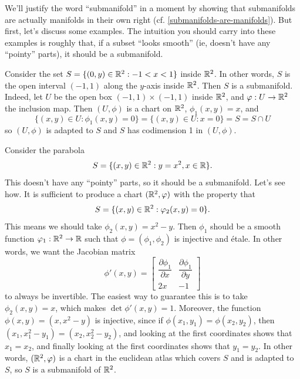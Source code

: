 We'll justify the word ``submanifold'' in a moment by showing that submanifolds are actually manifolds in their own right (cf. \cref{submanifolds-are-manifolds}). But first, let's discuss some examples. The intuition you should carry into these examples is roughly that, if a subset ``looks smooth'' (ie, doesn't have any ``pointy'' parts), it should be a submanifold. 

\begin{example}
	Consider the set $S = \{ (0,y) \in \mathbb{R}^2 : -1 < x < 1 \}$ inside $\mathbb{R}^2$. In other words, $S$ is the open interval $(-1,1)$ along the $y$-axis inside $\mathbb{R}^2$. Then $S$ is a submanifold. Indeed, let $U$ be the open box $(-1,1) \times (-1,1)$ inside $\mathbb{R}^2$, and $\varphi : U \to \mathbb{R}^2$ the inclusion map. Then $(U, \phi)$ is a chart on $\mathbb{R}^2$, $\phi_1(x,y) = x$, and 
	\[ \{ (x,y) \in U : \phi_1(x, y) = 0 \} = \{ (x,y) \in U : x = 0 \} = S = S \cap U \]
	so $(U,\phi)$ is adapted to $S$ and $S$ has codimension 1 in $(U,\phi)$. 
\end{example}

\begin{example}
	Consider the parabola \[ S = \{ (x, y) \in \mathbb{R}^2 : y = x^2, x \in \mathbb{R} \}. \] This doesn't have any ``pointy'' parts, so it should be a submanifold. Let's see how. It is sufficient to produce a chart $(\mathbb{R}^2, \varphi)$ with the property that 
	\[ S = \{ (x,y) \in \mathbb{R}^2 : \varphi_2(x,y) = 0 \}. \]
	This means we should take $\phi_2(x,y) = x^2 - y$. Then $\phi_1$ should be a smooth function $\varphi_1 : \mathbb{R}^2 \to \mathbb{R}$ such that $\phi = (\phi_1, \phi_2)$ is injective and \'etale. In other words, we want the Jacobian matrix 
	\[ \phi'(x,y) = \begin{bmatrix} \dfrac{\partial \phi_1}{\partial x} & \dfrac{\partial \phi_1}{\partial y} \\ 2x & -1 \end{bmatrix} \]
	to always be invertible. The easiest way to guarantee this is to take $\phi_2(x,y) = x$, which makes $\det \phi'(x,y) = 1$. Moreover, the function $\phi(x,y) = (x, x^2 - y)$ is injective, since if $\phi(x_1, y_1) = \phi(x_2,y_2)$, then $(x_1, x_1^2 - y_1) = (x_2, x_2^2 - y_2)$, and looking at the first coordinates shows that $x_1 = x_2$, and finally looking at the first coordinates shows that $y_1 = y_2$. In other words, $(\mathbb{R}^2, \varphi)$ is a chart in the euclidean atlas which covers $S$ and is adapted to $S$, so $S$ is a submanifold of $\mathbb{R}^2$. 
\end{example}


